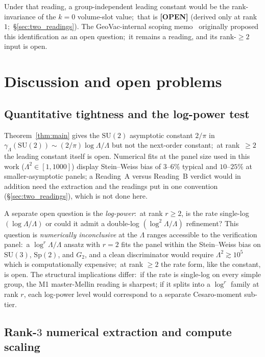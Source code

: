 \documentclass[11pt,a4paper]{article}
\theoremstyle{plain}
\theoremstyle{definition}
\newcommand{\Lammax}{\Lambda}
\newcommand{\SU}{\mathrm{SU}}
\newcommand{\Sp}{\mathrm{Sp}}
\begin{document}
Under that reading, a group-independent leading constant would be the
rank-invariance of the $k = 0$ volume-slot value;\ that is
\textbf{[OPEN]} (derived only at rank~$1$;\ \S\ref{sec:two_readings}).
The GeoVac-internal scoping memo~\cite{unified_gh_scoping_memo}
originally proposed this identification as an open question;\ it
remains a reading, and its rank-$\ge 2$ input is open.

\section{Discussion and open problems}\label{sec:discussion}

\subsection{Quantitative tightness and the log-power test}\label{sec:tightness}

Theorem~\ref{thm:main} gives the $\SU(2)$ asymptotic constant $2/\pi$ in
$\gamma_\Lammax(\SU(2)) \sim (2/\pi)\log\Lammax/\Lammax$ but not the
next-order constant;\ at rank~$\ge 2$ the leading constant itself is
open. Numerical fits at the panel size used in this
work ($\Lammax^2 \in [1, 1000]$) display Stein--Weiss bias of $3$--$6\%$
typical and $10$--$25\%$ at smaller-asymptotic panels; a Reading~A
versus Reading~B verdict would in addition need the extraction and the
readings put in one convention (\S\ref{sec:two_readings}), which is not
done here.

A separate open question is the \emph{log-power}:\ at rank $r \ge 2$,
is the rate single-log $(\log\Lammax/\Lammax)$ or could it admit a
double-log $(\log^2\Lammax/\Lammax)$ refinement? This question is
\emph{numerically inconclusive} at the $\Lammax$ ranges accessible to
the verification panel:\ a $\log^r\Lammax/\Lammax$ ansatz with $r = 2$
fits the panel within the Stein--Weiss bias on $\SU(3)$, $\Sp(2)$, and
$G_2$, and a clean discriminator would require $\Lammax^2 \gtrsim 10^5$
which is computationally expensive;\ at rank $\ge 2$ the rate form,
like the constant, is open. The structural
implications differ:\ if the rate is single-log on every simple group, the M1
master-Mellin reading is sharpest; if it splits into a $\log^r$ family
at rank $r$, each log-power level would correspond to a separate
Cesaro-moment sub-tier.

\subsection{Rank-$3$ numerical extraction and compute scaling}
\label{sec:rank3_compute}
\end{document}

